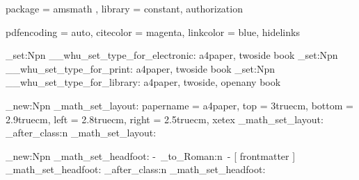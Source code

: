 \WHUDependency 
  {
    package = { amsmath },
    library = { constant, authorization }
  }


\AtEndPreamble
  {
    \RequirePackage { hyperref }
    \hypersetup 
      { 
        pdfencoding = auto,
        citecolor   = magenta,
        linkcolor   = blue,
        hidelinks
      }
  }



\cs_set:Npn \__whu_set_type_for_electronic:
  {
    \PassOptionsToClass 
      { a4paper, twoside } { book }
  }
\cs_set:Npn \__whu_set_type_for_print:
  {
    \PassOptionsToClass 
      { a4paper, twoside } { book }
    \AtEndPreamble { \hypersetup { allcolors = black } }
  }
\cs_set:Npn \__whu_set_type_for_library:
  {
    \PassOptionsToClass 
      { a4paper, twoside, openany } { book }
    \AtEndPreamble { \hypersetup { allcolors = black } }
  }



\cs_new:Npn \whu_math_set_layout:
  {
    \setuplayout
      {
        papername = a4paper,
        top       = 3truecm,
        bottom    = 2.9truecm,
        left      = 2.8truecm,
        right     = 2.5truecm,
        xetex
      }
  }
  { \whu_math_set_layout: }
  { \whu_after_class:n { \whu_math_set_layout: } }



\cs_new:Npn \whu_math_set_headfoot:
  {
      {
        \setheadrulewidth { 0.5pt }
        \setfootrulewidth { 0pt }
        \sethead [LR] {}
        \setcenterfoot 
          { 
            -\,
            \int_to_Roman:n { \c@page }  %
            \,- 
          }
      }
     [ frontmatter ]
      {
      }
      {
      }
      {
      }
  }
  { \whu_math_set_headfoot: }
  { \whu_after_class:n { \whu_math_set_headfoot: } }



